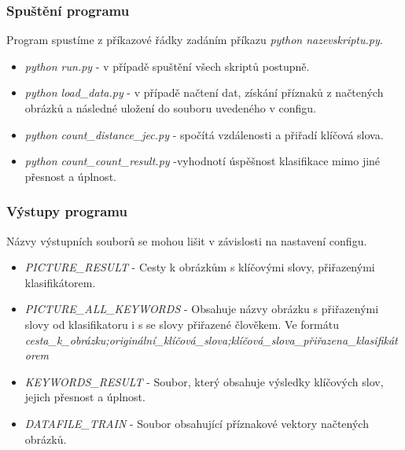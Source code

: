 \documentclass[czech,BP]{thesiskiv}
\begin{document}
\subsubsection{Spuštění programu}
Program spustíme z příkazové řádky zadáním příkazu \textit{python nazevskriptu.py}. 
\begin{itemize}
	\item \textit{python run.py} - v případě spuštění všech skriptů postupně.
	\item \textit{python load\_data.py} - v případě načtení dat, získání příznaků z načtených obrázků a následné uložení do souboru uvedeného v configu.
	\item \textit{python count\_distance\_jec.py} - spočítá vzdálenosti a přiřadí klíčová slova.
	\item \textit{python count\_count\_result.py} -vyhodnotí úspěšnost klasifikace mimo jiné přesnost a úplnost.
\end{itemize}

\subsubsection{Výstupy programu}
Názvy výstupních souborů se mohou lišit v závislosti na nastavení configu.
\begin{itemize}
	\item \textit{PICTURE\_RESULT} - Cesty k obrázkům s klíčovými slovy, přiřazenými klasifikátorem.
	\item \textit{PICTURE\_ALL\_KEYWORDS} - Obsahuje názvy obrázku s přiřazenými slovy od klasifikatoru i s se slovy přiřazené člověkem. Ve formátu \textit{cesta\_k\_obrázku;originální\_klíčová\_slova;klíčová\_slova\_přiřazena\_klasifikátorem}
	\item \textit{KEYWORDS\_RESULT} - Soubor, který obsahuje výsledky klíčových slov, jejich přesnost a úplnost.
	\item \textit{DATAFILE\_TRAIN} - Soubor obsahující příznakové vektory načtených obrázků. 
\end{itemize}
		
\end{document}
